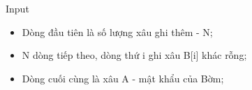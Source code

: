 Input  
\begin{itemize}
	\item     Dòng đầu tiên là số lượng xâu ghi thêm - N;   
	\item     N dòng tiếp theo, dòng thứ i ghi xâu B[i] khác rỗng;   
	\item     Dòng cuối cùng là xâu A - mật khẩu của Bờm;   
\end{itemize}